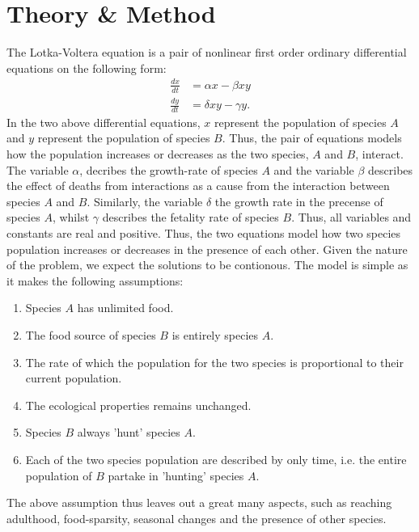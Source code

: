 \documentclass[a4paper]{article}
\begin{document}
\section{Theory \& Method}
The Lotka-Voltera equation is a pair of nonlinear first order ordinary differential equations on the following form:
\begin{align}
    \frac{dx}{dt} &= \alpha x - \beta xy \nonumber\\
    \frac{dy}{dt} &= \delta xy - \gamma y.\label{eq: Lotka-Voltera equations}
\end{align}In the two above differential equations, $x$ represent the population of species $A$ and $y$ represent the population of species $B$. Thus, the pair of equations models how the population increases or decreases as the two species, $A$ and $B$, interact.
The variable $\alpha$, decribes the growth-rate of species $A$ and the variable $\beta$ describes the effect of deaths from interactions as a cause from the interaction between species $A$ and $B$. Similarly, the variable $\delta$ the growth rate in the precense of species $A$, whilst $\gamma$ describes the fetality rate of species $B$. Thus, all variables and constants are real and positive.
Thus, the two equations model how two species population increases or decreases in the presence of each other.
Given the nature of the problem, we expect the solutions to be contionous.
The model is simple as it makes the following assumptions:
\begin{enumerate}
    \item Species $A$ has unlimited food.
    \item The food source of species $B$ is entirely species $A$.
    \item The rate of which the population for the two species is proportional to their current population.
    \item The ecological properties remains unchanged.
    \item Species $B$ always 'hunt' species $A$.
    \item Each of the two species population are described by only time, i.e. the entire population of $B$ partake in 'hunting' species $A$.
\end{enumerate}The above assumption thus leaves out a great many aspects, such as reaching adulthood, food-sparsity, seasonal changes and the presence of other species.
\end{document}
